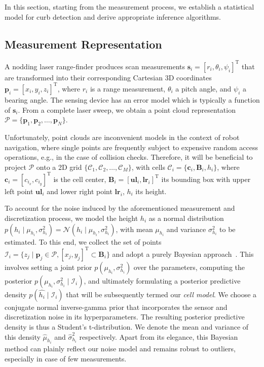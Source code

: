 In this section, starting from the measurement process, we establish a
statistical model for curb detection and derive appropriate inference
algorithms.

\subsection{Measurement Representation}

A nodding laser range-finder produces scan measurements $\mathbf{s}_i=[r_i,
\theta_i,\psi_i]^\text{T}$ that are transformed into their corresponding
Cartesian 3D coordinates $\mathbf{p}_i=[x_i,y_i,z_i]^\text{T}$, where $r_i$ is
a range measurement, $\theta_i$ a pitch angle, and $\psi_i$ a bearing angle. The
sensing device has an error model which is typically a function of
$\mathbf{s}_i$. From a complete laser sweep, we obtain a point cloud
representation $\mathcal{P}=\{\mathbf{p}_1,\mathbf{p}_2,\dots,\mathbf{p}_N\}$.

Unfortunately, point clouds are inconvenient models in the context of robot
navigation, where single points are frequently subject to expensive random
access operations, e.g., in the case of collision checks. Therefore, it will be
beneficial to project $\mathcal{P}$ onto a 2D grid
$\{\mathcal{C}_1,\mathcal{C}_2,\dots,\mathcal{C}_M\}$, with cells
$\mathcal{C}_i=\{\mathbf{c}_i,\mathbf{B}_i,h_i\}$, where
$\mathbf{c}_i=[c_{i_x},c_{i_y}]^\text{T}$ is the cell center,
$\mathbf{B}_i=[\mathbf{ul}_i, \mathbf{lr}_i]^\text{T}$ its bounding box with
upper left point $\mathbf{ul}_i$ and lower right point $\mathbf{lr}_i$, $h_i$
its height.

To account for the noise induced by the aforementioned measurement and
discretization process, we model the height $h_i$ as a normal distribution
$p(h_i\mid\mu_{h_i},\sigma^2_{h_i})=\mathcal{N}(h_i\mid\mu_{h_i},
\sigma^2_{h_i})$, with mean $\mu_{h_i}$ and variance $\sigma^2_{h_i}$ to be
estimated. To this end, we collect the set of points $\mathcal{I}_i=\{z_j\mid
\mathbf{p}_j\in\mathcal{P}, [x_j,y_j]^\text{T}\subset\mathbf{B}_i\}$ and adopt a
purely Bayesian approach~\cite{gelman03bayesian}. This involves setting a joint
prior $p(\mu_{h_i},\sigma^2_{h_i})$ over the parameters, computing the
posterior $p(\mu_{h_i},\sigma^2_{h_i}\mid\mathcal{I}_i)$, and ultimately
formulating a posterior predictive density $p(\hat{h_i}\mid\mathcal{I}_i)$ that
will be subsequently termed our \emph{cell model}. We choose a conjugate
normal inverse-gamma prior that incorporates the sensor and discretization noise
in its hyperparameters. The resulting posterior predictive density is thus a
Student's t-distribution. We denote the mean and variance of this density
$\hat{\mu}_{h_i}$ and $\hat{\sigma}^2_{h_i}$ respectively. Apart from its
elegance, this Bayesian method can plainly reflect our noise model and remains
robust to outliers, especially in case of few measurements.

